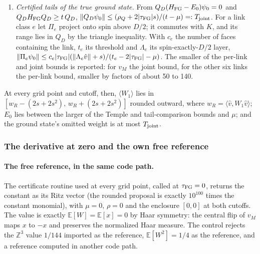 \begin{enumerate}[label=\arabic*.]
\begin{equation}
  \bigl|\langle\hat v,W_1\hat v\rangle-\langle\psi_0,W_1\psi_0\rangle\bigr|
  \le2s\sigma+2s^2\le2s+2s^2,\qquad
  \sigma=\norm{(W_1-\langle W_1\rangle)\psi_0}\le1 .
  \label{eq:az2-observable}
 \end{equation}
\item \emph{Certified tails of the true ground state.} From
 $Q_D(H_{\rm FG}-E_0)\psi_0=0$ and $Q_DH_{\rm FG}Q_D\ge t\,Q_D$,
 $\left\lVert Q_D\psi_0\right\rVert\le(\rho_Q+2|\tau_{\mathrm{FG}}|s)/(t-\mu)=:T_{\rm joint}$. For a link
 class $e$ let $\Pi_e$ project onto spin above $D/2$; it commutes with $K$,
 and its range lies in $Q_D$ by the triangle inequality. With $c_e$ the number
 of faces containing the link, $t_e$ its threshold and $\Lambda_e$ its
 spin-exactly-$D/2$ layer,
 $\left\lVert\Pi_e\psi_0\right\rVert\le c_e|\tau_{\mathrm{FG}}|(\left\lVert\Lambda_e\hat v\right\rVert+s)/(t_e-2|\tau_{\mathrm{FG}}|-\mu)$.
 The smaller of the per-link and joint bounds is reported: for $v_M$ the joint
 bound, for the other six links the per-link bound, smaller by factors of
 about 50 to 140.
\end{enumerate}
At every grid point and cutoff, then, $\langle W_1\rangle$ lies in
$[w_R-(2s+2s^2),\,w_R+(2s+2s^2)]$ rounded outward, where
$w_R=\langle\hat v,W_1\hat v\rangle$; $E_0$ lies between the larger of the
Temple and tail-comparison bounds and $\mu$; and the ground state's omitted
weight is at most $T_{\rm joint}$.

\subsubsection{The derivative at zero and the own free reference}
\label{sec:az2-derivative}
\paragraph{The free reference, in the same code path.}
The certificate routine used at every grid point, called at $\tau_{\mathrm{FG}}=0$, returns
the constant as its Ritz vector (the rounded proposal is exactly $10^{100}$
times the constant monomial), with $\mu=0$, $\rho=0$ and the enclosure
$[0,0]$ at both cutoffs. The value is exactly $\mathbb E[W]=\mathbb E[x]=0$ by
Haar symmetry: the central flip of $v_M$ maps $x$ to $-x$ and preserves the
normalized Haar measure. The control  rejects the
$\mathbb Z^3$ value $1/144$ imported as the reference, $\mathbb E[W^2]=1/4$ as
the reference, and a reference computed in another code path.

